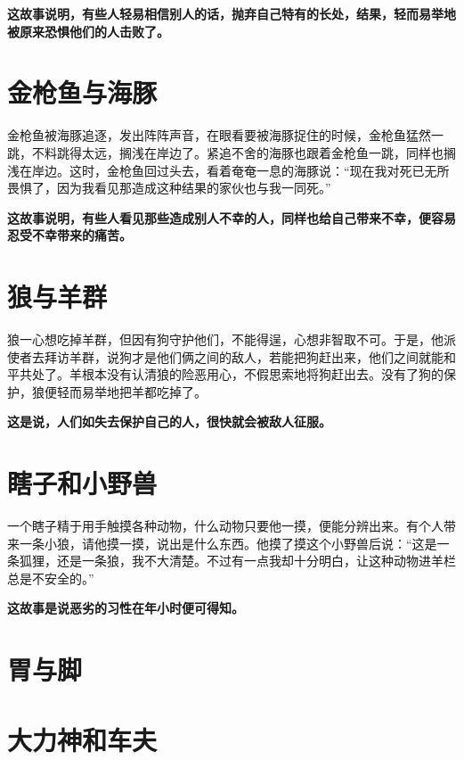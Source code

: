 {\bfseries \color{red}这故事说明，有些人轻易相信别人的话，抛弃自己特有的长处，结果，轻而易举地被原来恐惧他们的人击败了。}

\section{金枪鱼与海豚}

金枪鱼被海豚追逐，发出阵阵声音，在眼看要被海豚捉住的时候，金枪鱼猛然一跳，不料跳得太远，搁浅在岸边了。紧追不舍的海豚也跟着金枪鱼一跳，同样也搁浅在岸边。这时，金枪鱼回过头去，看着奄奄一息的海豚说：“现在我对死已无所畏惧了，因为我看见那造成这种结果的家伙也与我一同死。”

{\bfseries \color{red}这故事说明，有些人看见那些造成别人不幸的人，同样也给自己带来不幸，便容易忍受不幸带来的痛苦。}

\section{狼与羊群}

狼一心想吃掉羊群，但因有狗守护他们，不能得逞，心想非智取不可。于是，他派使者去拜访羊群，说狗才是他们俩之间的敌人，若能把狗赶出来，他们之间就能和平共处了。羊根本没有认清狼的险恶用心，不假思索地将狗赶出去。没有了狗的保护，狼便轻而易举地把羊都吃掉了。

{\bfseries \color{red}这是说，人们如失去保护自己的人，很快就会被敌人征服。}

\section{瞎子和小野兽}

一个瞎子精于用手触摸各种动物，什么动物只要他一摸，便能分辨出来。有个人带来一条小狼，请他摸一摸，说出是什么东西。他摸了摸这个小野兽后说：“这是一条狐狸，还是一条狼，我不大清楚。不过有一点我却十分明白，让这种动物进羊栏总是不安全的。”

{\bfseries \color{red}这故事是说恶劣的习性在年小时便可得知。}

\section{胃与脚}



{\bfseries \color{red}}

\section{大力神和车夫}

